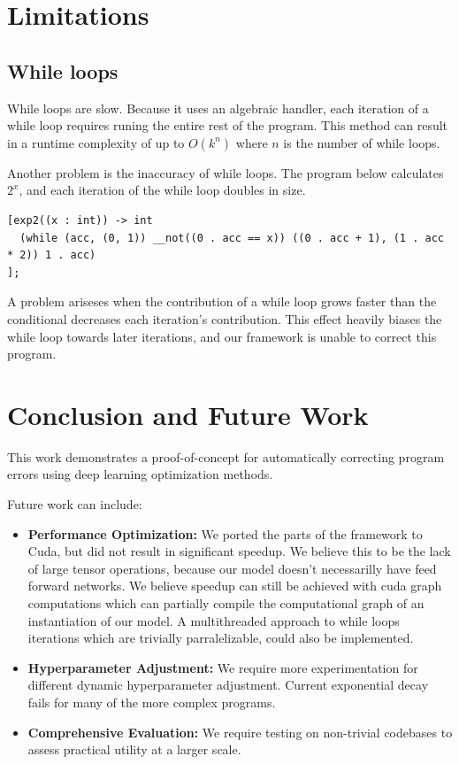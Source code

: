 \documentclass{article}
\begin{document}
\section{Limitations}
\subsection*{While loops}
While loops are slow. Because it uses an algebraic handler, each iteration of a while loop requires runing the entire rest of the program. This method can result in a runtime complexity of up to $O(k^n)$ where $n$ is the number of while loops.

Another problem is the inaccuracy of while loops. The program below calculates $2^x$, and each iteration of the while loop doubles in size.
\begin{verbatim}
[exp2((x : int)) -> int
  (while (acc, (0, 1)) __not((0 . acc == x)) ((0 . acc + 1), (1 . acc * 2)) 1 . acc)
];
\end{verbatim}
A problem ariseses when the contribution of a while loop grows faster than the conditional decreases each iteration's contribution. This effect heavily biases the while loop towards later iterations, and our framework is unable to correct this program.

\section{Conclusion and Future Work}
This work demonstrates a proof-of-concept for automatically correcting program errors using deep learning optimization methods.

Future work can include:
\begin{itemize}
\item \textbf{Performance Optimization:} We ported the parts of the framework to Cuda, but did not result in significant speedup. We believe this to be the lack of large tensor operations, because our model doesn't necessarilly have feed forward networks. We believe speedup can still be achieved with cuda graph computations which can partially compile the computational graph of an instantiation of our model. A multithreaded approach to while loops iterations which are trivially parralelizable, could also be implemented.
\item \textbf{Hyperparameter Adjustment:} We require more experimentation for different dynamic hyperparameter adjustment. Current exponential decay fails for many of the more complex programs.
\item \textbf{Comprehensive Evaluation:} We require testing on non-trivial codebases to assess practical utility at a larger scale.
\end{itemize}



\end{document}
